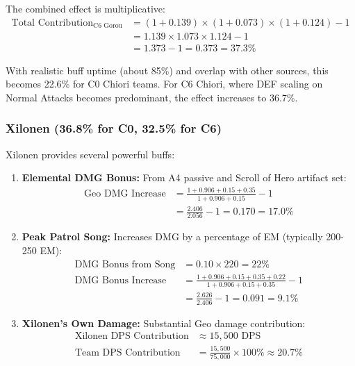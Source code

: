 \documentclass[12pt,a4paper]{article}
\begin{document}
The combined effect is multiplicative:
\begin{align}
\text{Total Contribution}_{\text{C6 Gorou}} &= (1 + 0.139) \times (1 + 0.073) \times (1 + 0.124) - 1 \\
&= 1.139 \times 1.073 \times 1.124 - 1 \\
&= 1.373 - 1 = 0.373 = 37.3\%
\end{align}

With realistic buff uptime (about 85\%) and overlap with other sources, this becomes 22.6\% for C0 Chiori teams. For C6 Chiori, where DEF scaling on Normal Attacks becomes predominant, the effect increases to 36.7\%.

\subsubsection{Xilonen (36.8\% for C0, 32.5\% for C6)}

Xilonen provides several powerful buffs:

\begin{enumerate}
    \item \textbf{Elemental DMG Bonus:} From A4 passive and Scroll of Hero artifact set:
    \begin{align}
    \text{Geo DMG Increase} &= \frac{1 + 0.906 + 0.15 + 0.35}{1 + 0.906 + 0.15} - 1 \\
    &= \frac{2.406}{2.056} - 1 = 0.170 = 17.0\%
    \end{align}
    
    \item \textbf{Peak Patrol Song:} Increases DMG by a percentage of EM (typically 200-250 EM):
    \begin{align}
    \text{DMG Bonus from Song} &= 0.10 \times 220 = 22\% \\
    \text{DMG Bonus Increase} &= \frac{1 + 0.906 + 0.15 + 0.35 + 0.22}{1 + 0.906 + 0.15 + 0.35} - 1 \\
    &= \frac{2.626}{2.406} - 1 = 0.091 = 9.1\%
    \end{align}
    
    \item \textbf{Xilonen's Own Damage:} Substantial Geo damage contribution:
    \begin{align}
    \text{Xilonen DPS Contribution} &\approx 15,500 \text{ DPS} \\
    \text{Team DPS Contribution} &= \frac{15,500}{75,000} \times 100\% \approx 20.7\%
    \end{align}
\end{enumerate}
\end{document}
